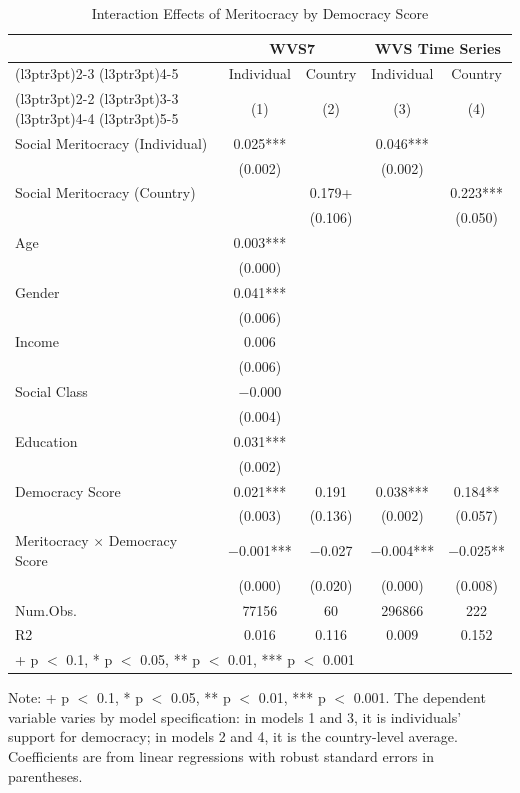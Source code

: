 \begin{table}[!h]
\centering\centering
\caption{Interaction Effects of Meritocracy by Democracy Score}
\centering
\begin{threeparttable}
\fontsize{10}{12}\selectfont
\begin{tabular}[t]{lcccc}
\toprule
\multicolumn{1}{c}{ } & \multicolumn{2}{c}{WVS7} & \multicolumn{2}{c}{WVS Time Series} \\
\cmidrule(l{3pt}r{3pt}){2-3} \cmidrule(l{3pt}r{3pt}){4-5}
\multicolumn{1}{c}{ } & \multicolumn{1}{c}{Individual} & \multicolumn{1}{c}{Country} & \multicolumn{1}{c}{Individual } & \multicolumn{1}{c}{Country } \\
\cmidrule(l{3pt}r{3pt}){2-2} \cmidrule(l{3pt}r{3pt}){3-3} \cmidrule(l{3pt}r{3pt}){4-4} \cmidrule(l{3pt}r{3pt}){5-5}
  &  (1) &   (2) &   (3) &   (4)\\
\midrule
Social Meritocracy (Individual) & 0.025*** &  & 0.046*** & \\
 & (0.002) &  & (0.002) & \\
Social Meritocracy (Country) &  & 0.179+ &  & 0.223***\\
 &  & (0.106) &  & (0.050)\\
Age & 0.003*** &  &  & \\
 & (0.000) &  &  & \\
Gender & 0.041*** &  &  & \\
 & (0.006) &  &  \vphantom{1} & \\
Income & 0.006 &  &  & \\
 & (0.006) &  &  & \\
Social Class & −0.000 &  &  & \\
 & (0.004) &  &  & \\
Education & 0.031*** &  &  & \\
 & (0.002) &  &  & \\
Democracy Score & 0.021*** & 0.191 & 0.038*** & 0.184**\\
 & (0.003) & (0.136) & (0.002) & (0.057)\\
Meritocracy $\times$ Democracy Score & −0.001*** & −0.027 & −0.004*** & −0.025**\\
 & (0.000) & (0.020) & (0.000) & (0.008)\\
Num.Obs. & 77156 & 60 & 296866 & 222\\
R2 & 0.016 & 0.116 & 0.009 & 0.152\\
\bottomrule
\multicolumn{5}{l}{\rule{0pt}{1em}+ p $<$ 0.1, * p $<$ 0.05, ** p $<$ 0.01, *** p $<$ 0.001}\\
\end{tabular}
\begin{tablenotes}
\item Note: + p $<$ 0.1, * p $<$ 0.05, ** p $<$ 0.01, *** p $<$ 0.001. The dependent variable varies by model specification: in models 1 and 3, it is individuals' support for democracy; in models 2 and 4, it is the country-level average. Coefficients are from linear regressions with robust standard errors in parentheses.
\end{tablenotes}
\end{threeparttable}
\end{table}
